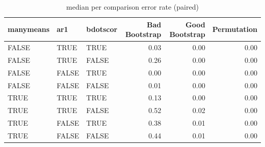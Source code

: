 \documentclass{article}
\begin{document}
\begin{table}[H]
\centering
\begin{tabular}{lllrrr}
  \hline
  manymeans & ar1 & bdotscor &  Bad Bootstrap & Good Bootstrap & Permutation  \\ 
  \hline
FALSE & TRUE & TRUE & 0.03 & 0.00 & 0.00 \\ 
  FALSE & TRUE & FALSE & 0.26 & 0.00 & 0.00 \\ 
  FALSE & FALSE & TRUE & 0.00 & 0.00 & 0.00 \\ 
  FALSE & FALSE & FALSE & 0.01 & 0.00 & 0.00 \\ 
  TRUE & TRUE & TRUE & 0.13 & 0.00 & 0.00 \\ 
  TRUE & TRUE & FALSE & 0.52 & 0.02 & 0.00 \\ 
  TRUE & FALSE & TRUE & 0.38 & 0.01 & 0.00 \\ 
  TRUE & FALSE & FALSE & 0.44 & 0.01 & 0.00 \\ 
   \hline
\end{tabular}
\caption{median per comparison error rate (paired)}
\end{table}


\end{document}
